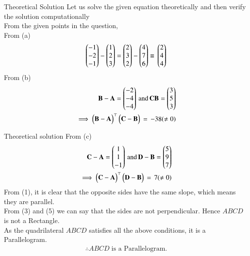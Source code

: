 \documentclass{beamer}
\begin{document}
\begin{frame}{Theoretical Solution}
Let us solve the given equation theoretically and then verify the solution computationally\\
From the given points in the question,\\
\hspace{1cm} From (a)\\
\begin{align}
   \begin{pmatrix}-1\\-2\\-1\end{pmatrix}-\begin{pmatrix}1\\2\\3\end{pmatrix}=\begin{pmatrix}2\\3\\2\end{pmatrix}-\begin{pmatrix}4\\7\\6\end{pmatrix}\equiv \, \begin{pmatrix}2\\4\\4\end{pmatrix}
\end{align}
From (b)
\begin{align}
    \mathbf{B}-\mathbf{A}=\begin{pmatrix}-2\\-4\\-4\end{pmatrix} \,\text{and}\, \mathbf{C} \mathbf{B}=\begin{pmatrix}3\\5\\3\end{pmatrix}\\
    \implies \begin{pmatrix}\mathbf{B-A}\end{pmatrix}^\top\begin{pmatrix}\mathbf{C-B}\end{pmatrix}\,=\,-38(\neq0)
\end{align}
\end{frame}

\begin{frame}{Theoretical solution}
From (c)
\begin{align}
    \mathbf{C}-\mathbf{A}=\begin{pmatrix}1\\1\\-1\end{pmatrix}\,\text{and}\, \mathbf{D}-\mathbf{B}=\begin{pmatrix}5\\9\\7\end{pmatrix}\\
    \implies \begin{pmatrix}\mathbf{C-A}\end{pmatrix}^\top\begin{pmatrix}\mathbf{D-B}\end{pmatrix}\,=\,7(\neq0)
\end{align}
From (1), it is clear that the opposite sides have the same slope, which means they are parallel.\\
From (3) and (5) we can say that the sides are not perpendicular. Hence $ABCD$ is not a Rectangle.\\[4pt]
As the quadrilateral $ABCD$ satisfies all the above conditions, it is a Parallelogram.\\
\vspace{0.5cm}
\begin{align*}
    \therefore ABCD\; \text{is a Parallelogram.}
\end{align*}
\end{frame}
\end{document}
